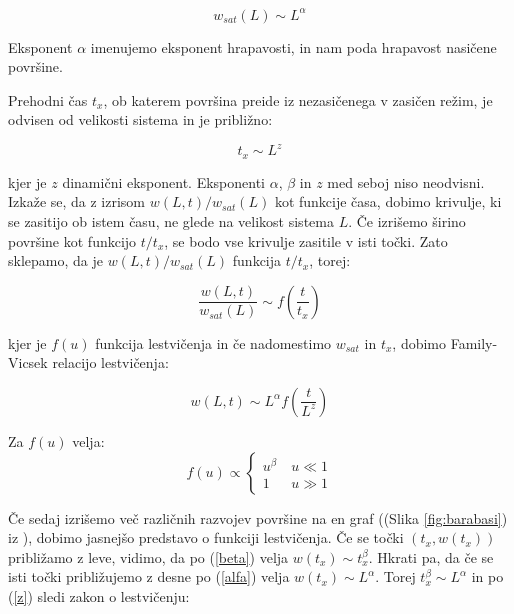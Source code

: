 \documentclass[a4paper, twoside, 12pt]{book}
\begin{document}
        \begin{equation}
          w_{sat}(L) \sim L^\alpha
          \label{alfa}
        \end{equation}

        Eksponent $\alpha$ imenujemo eksponent hrapavosti, in nam poda hrapavost nasičene površine.

        Prehodni čas $t_x$, ob katerem površina preide iz nezasičenega v zasičen režim, je odvisen od velikosti sistema in je približno:

        \begin{equation}
          t_x \sim L^z
          \label{z}
        \end{equation}

        kjer je $z$ dinamični eksponent.
        Eksponenti $\alpha$, $\beta$ in $z$ med seboj niso neodvisni.
        Izkaže se, da z izrisom $w(L,t)/w_{sat}(L)$ kot funkcije časa, dobimo krivulje, ki se zasitijo ob istem času, ne glede na velikost sistema $L$.
        Če izrišemo širino površine kot funkcijo $t/t_x$, se bodo vse krivulje zasitile v isti točki.
        Zato sklepamo, da je $w(L,t)/w_{sat}(L)$ funkcija $t/t_x$, torej:

        \begin{equation}
          \frac{w(L,t)}{w_{sat}(L)} \sim f(\frac{t}{t_x})
        \end{equation}

        kjer je $f(u)$ funkcija lestvičenja in če nadomestimo $w_{sat}$ in $t_x$, dobimo Family-Vicsek relacijo lestvičenja:

        \begin{equation}
          w(L,t) \sim L^\alpha f(\frac{t}{L^z})
          \label{family-vicsek}
        \end{equation}

        Za $f(u)$ velja:
        \begin{equation}
          f(u) \propto \left \{ \begin{array}{lr} u^{\beta} & \ u\ll 1 \\
            1 & \ u\gg1\end{array} \right. 
        \end{equation}

            Če sedaj izrišemo več različnih razvojev površine na en graf ((Slika \ref{fig:barabasi}) iz \cite{barabasi1995fractal}), dobimo jasnejšo predstavo o funkciji lestvičenja. Če se točki $(t_x,w(t_x))$ približamo z leve, vidimo, da po (\ref{beta}) velja $w(t_x) \sim t_x^\beta$. Hkrati pa, da če se isti točki približujemo z desne po (\ref{alfa}) velja $w(t_x) \sim L^\alpha$. Torej $t_x^\beta \sim L^\alpha$ in po (\ref{z}) sledi zakon o lestvičenju:
\end{document}
